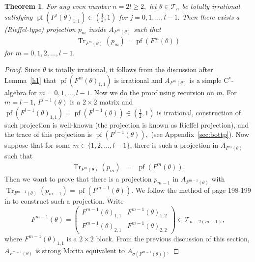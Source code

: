 \documentclass[9pt, BCOR=2mm]{amsart}
\numberwithin{equation}{section}
\numberwithin{equation}{section}
\newtheorem{theorem}{Theorem}[section]
\newcommand{\pf}{{\operatorname{pf}}}
\DeclareMathOperator{\Tr}{Tr}
\begin{document}
\begin{theorem}\label{even n projection}
  For any even number $n=2l\geq2,$ let $\theta\in \mathcal{T}_n$ be totally irrational satisfying ${\pf}(F^j(\theta)_{1,1})\in (\frac{1}{2},1)$ for $j=0,1,\dots,l-1.$ Then
  there exists a (Rieffel-type) projection $p_m$ inside $A_{F^m(\theta)}$ such that
  \begin{eqnarray}\Tr_{F^m(\theta)}(p_m)={\pf}(F^m(\theta))\nonumber
   \end{eqnarray}
   for $m=0,1,2,\dots,l-1.$ 
\end{theorem}
\begin{proof}
Since $\theta$ is totally irrational, it follows from the discussion after Lemma~\ref{h1} that ${\pf}(F^m(\theta)_{1,1})$ is irrational and
$A_{F^{m}(\theta)}$ is a simple C$^*$-algebra for $m=0,1,\dots,l-1$.
Now we do the proof using recursion on $m.$ For $m=l-1$, $F^{l-1}(\theta)$ is a $2\times2$ matrix and  ${\pf}(F^{l-1}(\theta)_{1,1})={\pf}(F^{l-1}(\theta))\in (\frac{1}{2},1)$ is irrational, construction of such projection is well-known
  (the projection is known as Rieffel projection), and the trace of this projection is ${\pf}(F^{l-1}(\theta)),$ (see Appendix~\ref{sec:bottp}). 
  Now suppose that for some $m\in \{1,2,\dots,l-1\}$, there is such a projection in
$A_{F^m(\theta)}$ such that \begin{eqnarray}\label{u1}
\Tr_{F^m(\theta)}(p_m)&=&{\pf}(F^m(\theta)).
\end{eqnarray} 
Then we want to prove that there is a projection $p_{m-1}$ in $A_{F^{m-1}(\theta)}$ with $\Tr_{F^{m-1}(\theta)}(p_{m-1})={\pf}(F^{m-1}(\theta)).$ We follow the method of page 198-199 in \cite{Boc97} to construct such a projection. Write
   $$F^{m-1}(\theta)=\left(\begin{matrix}
                  F^{m-1}(\theta)_{1,1} &  F^{m-1}(\theta)_{1,2} \\
                 F^{m-1}(\theta)_{2,1}& F^{m-1}(\theta)_{2,2}
                 \end{matrix}
\right)%
\in \mathcal{T}_{n-2(m-1)},$$
where $F^{m-1}(\theta)_{1,1}$ is a $2\times 2$ block.
 From the previous discussion of this section, $A_{F^{m-1}(\theta)}$ is strong Morita equivalent to $A_{\sigma(F^{m-1}(\theta))},$

\end{proof}
\end{document}
